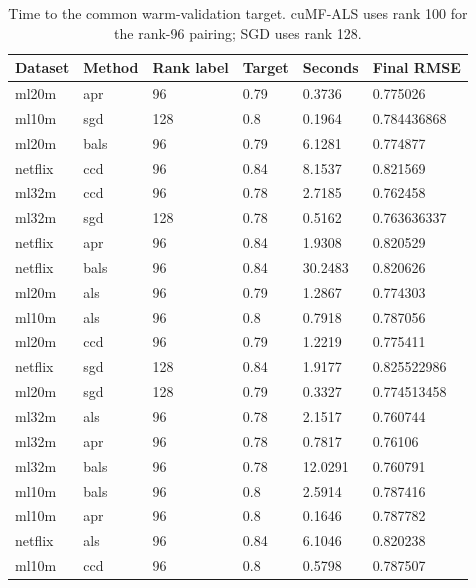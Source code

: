 \begin{table}
\centering
\caption{Time to the common warm-validation target. cuMF-ALS uses rank 100 for the rank-96 pairing; SGD uses rank 128.}
\begin{tabular}{llllll}
\hline
Dataset & Method & Rank label & Target & Seconds & Final RMSE \\
\hline
ml20m & apr & 96 & 0.79 & 0.3736 & 0.775026 \\
ml10m & sgd & 128 & 0.8 & 0.1964 & 0.784436868 \\
ml20m & bals & 96 & 0.79 & 6.1281 & 0.774877 \\
netflix & ccd & 96 & 0.84 & 8.1537 & 0.821569 \\
ml32m & ccd & 96 & 0.78 & 2.7185 & 0.762458 \\
ml32m & sgd & 128 & 0.78 & 0.5162 & 0.763636337 \\
netflix & apr & 96 & 0.84 & 1.9308 & 0.820529 \\
netflix & bals & 96 & 0.84 & 30.2483 & 0.820626 \\
ml20m & als & 96 & 0.79 & 1.2867 & 0.774303 \\
ml10m & als & 96 & 0.8 & 0.7918 & 0.787056 \\
ml20m & ccd & 96 & 0.79 & 1.2219 & 0.775411 \\
netflix & sgd & 128 & 0.84 & 1.9177 & 0.825522986 \\
ml20m & sgd & 128 & 0.79 & 0.3327 & 0.774513458 \\
ml32m & als & 96 & 0.78 & 2.1517 & 0.760744 \\
ml32m & apr & 96 & 0.78 & 0.7817 & 0.76106 \\
ml32m & bals & 96 & 0.78 & 12.0291 & 0.760791 \\
ml10m & bals & 96 & 0.8 & 2.5914 & 0.787416 \\
ml10m & apr & 96 & 0.8 & 0.1646 & 0.787782 \\
netflix & als & 96 & 0.84 & 6.1046 & 0.820238 \\
ml10m & ccd & 96 & 0.8 & 0.5798 & 0.787507 \\
\hline
\end{tabular}
\end{table}
